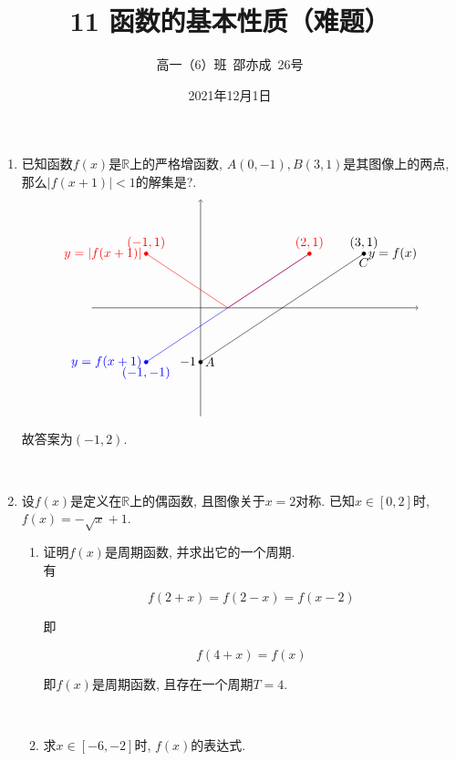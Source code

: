 \documentclass[8pt]{article}
\author{高一（6）班\ 邵亦成\ 26号}
\title{11 函数的基本性质（难题）}
\date{2021年12月1日}
\begin{document}
	\maketitle

	\begin{enumerate}[label=\arabic*.]
		\item 已知函数$f(x)$是$\mathbb{R}$上的严格增函数, $A(0, -1), B(3, 1)$是其图像上的两点, 那么$|f(x+1)|<1$的解集是?.
			~\\

			$$
			\begin{tikzpicture}[scale=1.5, baseline=0]
	    		\draw[black, ->] (-2,  0)--( 4,  0);
	    		\draw[black, ->] ( 0, -2)--( 0,  2);
	    		\draw[black] (0, -1)--(3, 1) node[right] {$y=f(x)$};
	    		\draw[blue] (2, 1)--(-1, -1) node[left] {$y=f(x+1)$};
	    		\draw[red] (2, 1)--(0.5, 0)--(-1, 1) node[left] {$y=|f(x+1)|$};
	    		\filldraw[black] (0, -1) circle (0.1em) node[anchor=east] {$-1$} node[anchor=west] {$A$};
	    		\filldraw[black] (3, 1) circle (0.1em) node[anchor=south] {$(3,1)$} node[anchor=north] {$C$};
	    		\filldraw[red] (2, 1) circle (0.1em) node[anchor=south] {$(2,1)$};
	    		\filldraw[blue] (-1, -1) circle (0.1em) node[anchor=north] {$(-1, -1)$};
	    		\filldraw[red] (-1, 1) circle (0.1em) node[anchor=south] {$(-1, 1)$};
	    	\end{tikzpicture}$$

	    	故答案为$(-1, 2).$

    	~\\

    	\item 设$f(x)$是定义在$\mathbb{R}$上的偶函数, 且图像关于$x=2$对称. 已知$x\in [0, 2]$时, $f(x)=-\sqrt{x}+1$.
    		\begin{enumerate}[label=(\arabic*)]
    			\item 证明$f(x)$是周期函数, 并求出它的一个周期.
    				~\\

					有

					$$f(2+x)=f(2-x)=f(x-2)$$

					即

					$$f(4+x)=f(x)$$

					即$f(x)$是周期函数, 且存在一个周期$T=4$.

				~\\

				\item 求$x\in [-6, -2]$时, $f(x)$的表达式.
					~\\


\end{enumerate}
\end{enumerate}
\end{document}
